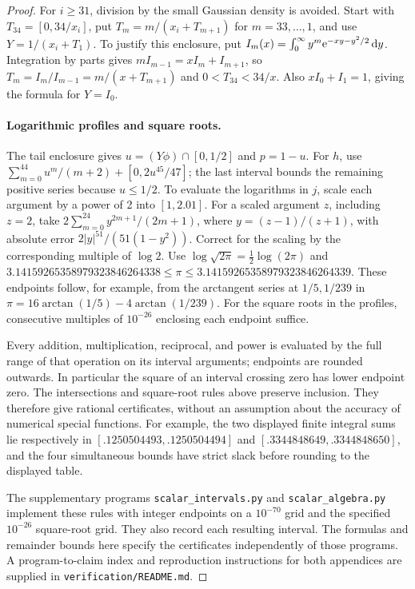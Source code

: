 \begin{proof}
For $i\ge31$, division by the small Gaussian density is avoided. Start with $T_{34}=[0,34/x_i]$, put $T_m=m/(x_i+T_{m+1})$ for $m=33,\ldots,1$, and use $Y=1/(x_i+T_1)$. To justify this enclosure, put $I_m(x)=\int_0^\infty y^m \mathrm{e}^{-xy-y^2/2}\,\mathrm{d} y$. Integration by parts gives $mI_{m-1}=xI_m+I_{m+1}$, so $T_m=I_m/I_{m-1}=m/(x+T_{m+1})$ and $0<T_{34}<34/x$. Also $xI_0+I_1=1$, giving the formula for $Y=I_0$.

\paragraph{Logarithmic profiles and square roots.}
The tail enclosure gives $u=(Y\phi)\cap[0,1/2]$ and $p=1-u$. For $h$, use $\sum_{m=0}^{44}u^m/(m+2)+[0,2u^{45}/47]$; the last interval bounds the remaining positive series because $u\le1/2$. To evaluate the logarithms in $j$, scale each argument by a power of 2 into $[1,2.01]$. For a scaled argument $z$, including $z=2$, take $2\sum_{m=0}^{24}y^{2m+1}/(2m+1)$, where $y=(z-1)/(z+1)$, with absolute error $2|y|^{51}/(51(1-y^2))$. Correct for the scaling by the corresponding multiple of $\log2$. Use $\log\sqrt{2\pi}=\frac12\log(2\pi)$ and $3.14159265358979323846264338\le\pi\le3.14159265358979323846264339$. These endpoints follow, for example, from the arctangent series at $1/5,1/239$ in $\pi=16\arctan(1/5)-4\arctan(1/239)$. For the square roots in the profiles, consecutive multiples of $10^{-26}$ enclosing each endpoint suffice.


Every addition, multiplication, reciprocal, and power is evaluated by the full range of that operation on its interval arguments; endpoints are rounded outwards. In particular the square of an interval crossing zero has lower endpoint zero. The intersections and square-root rules above preserve inclusion. They therefore give rational certificates, without an assumption about the accuracy of numerical special functions. For example, the two displayed finite integral sums lie respectively in $[.1250504493,.1250504494]$ and $[.3344848649,.3344848650]$, and the four simultaneous bounds have strict slack before rounding to the displayed table.

The supplementary programs \texttt{scalar\_intervals.py} and \texttt{scalar\_algebra.py} implement these rules with integer endpoints on a $10^{-70}$ grid and the specified $10^{-26}$ square-root grid. They also record each resulting interval. The formulas and remainder bounds here specify the certificates independently of those programs. A program-to-claim index and reproduction instructions for both appendices are supplied in \texttt{verification/README.md}.
\end{proof}

